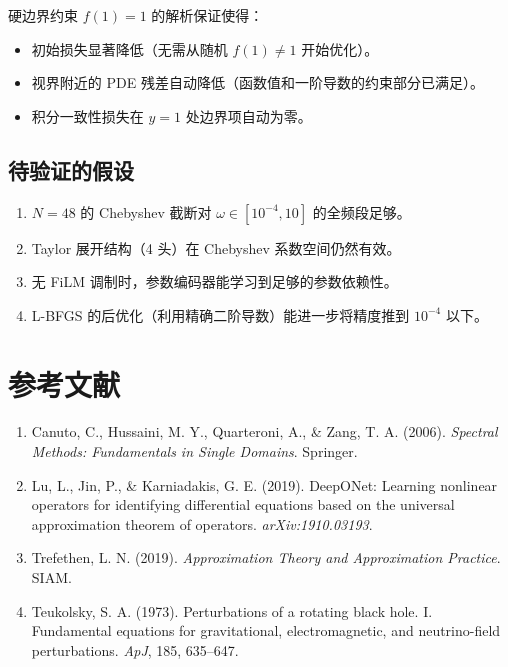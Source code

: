 \documentclass[11pt,a4paper]{article}
\begin{document}
硬边界约束 $f(1)=1$ 的解析保证使得：
\begin{itemize}
    \item 初始损失显著降低（无需从随机 $f(1)\neq 1$ 开始优化）。
    \item 视界附近的 PDE 残差自动降低（函数值和一阶导数的约束部分已满足）。
    \item 积分一致性损失在 $y=1$ 处边界项自动为零。
\end{itemize}

\subsection{待验证的假设}

\begin{enumerate}
    \item $N=48$ 的 Chebyshev 截断对 $\omega\in[10^{-4},10]$ 的全频段足够。
    \item Taylor 展开结构（4 头）在 Chebyshev 系数空间仍然有效。
    \item 无 FiLM 调制时，参数编码器能学习到足够的参数依赖性。
    \item L-BFGS 的后优化（利用精确二阶导数）能进一步将精度推到 $10^{-4}$ 以下。
\end{enumerate}

\section{参考文献}

\begin{enumerate}
    \item Canuto, C., Hussaini, M. Y., Quarteroni, A., \& Zang, T. A. (2006). \textit{Spectral Methods: Fundamentals in Single Domains}. Springer.
    \item Lu, L., Jin, P., \& Karniadakis, G. E. (2019). DeepONet: Learning nonlinear operators for identifying differential equations based on the universal approximation theorem of operators. \textit{arXiv:1910.03193}.
    \item Trefethen, L. N. (2019). \textit{Approximation Theory and Approximation Practice}. SIAM.
    \item Teukolsky, S. A. (1973). Perturbations of a rotating black hole. I. Fundamental equations for gravitational, electromagnetic, and neutrino-field perturbations. \textit{ApJ}, 185, 635--647.
\end{enumerate}
\end{document}
